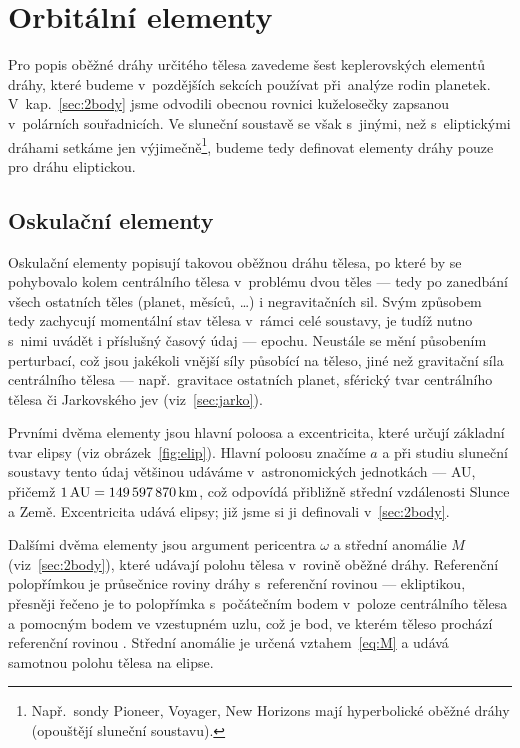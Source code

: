 \documentclass[A4paper, 12pt, oneside]{book}
\begin{document}
\pagebreak
\section{Orbitální elementy} \label{sec:orbelem}
Pro popis oběžné dráhy určitého tělesa zavedeme šest keplerovských elementů dráhy, které budeme v~pozdějších sekcích používat při~analýze rodin planetek. V~kap.~\ref{sec:2body} jsme odvodili obecnou rovnici kuželosečky zapsanou v~polárních souřadnicích. Ve sluneční soustavě se však s~jinými, než s~eliptickými dráhami setkáme jen výjimečně\footnote{Např.\ sondy Pioneer, Voyager, New Horizons mají hyperbolické oběžné dráhy (opouštějí sluneční soustavu).}, budeme tedy definovat elementy dráhy pouze pro dráhu eliptickou.
\subsection{Oskulační elementy}
Oskulační elementy popisují takovou oběžnou dráhu tělesa, po které by se pohybovalo kolem centrálního tělesa v~problému dvou těles --- tedy po zanedbání všech ostatních těles (planet, měsíců, \ldots) i negravitačních sil. Svým způsobem tedy zachycují momentální stav tělesa v~rámci celé soustavy, je tudíž nutno s~nimi uvádět i příslušný časový údaj --- epochu. Neustále se mění působením perturbací, což jsou jakékoli vnější síly působící na těleso, jiné než gravitační síla centrálního tělesa --- např.\ gravitace ostatních planet, sférický tvar centrálního tělesa či Jarkovského jev (viz~\ref{sec:jarko}).

Prvními dvěma elementy jsou hlavní poloosa a excentricita, které určují základní tvar elipsy (viz obrázek~\ref{fig:elip}). Hlavní poloosu značíme $a$ a při studiu sluneční soustavy tento údaj většinou udáváme v~astronomických jednotkách --- AU, přičemž $1\, {\rm AU} = 149\,597\,870\,{\rm km}$, což odpovídá přibližně střední vzdálenosti Slunce a Země. Excentricita udává  elipsy; již jsme si ji definovali v~\ref{sec:2body}.

Dalšími dvěma elementy jsou argument pericentra $\omega$ a střední anomálie $M$ (viz~\ref{sec:2body}), které udávají polohu tělesa v~rovině oběžné dráhy. Referenční polopřímkou je průsečnice roviny dráhy s~referenční rovinou --- ekliptikou, přesněji řečeno je to polopřímka s~počátečním bodem v~poloze centrálního tělesa a pomocným bodem ve vzestupném uzlu, což je bod, ve kterém těleso prochází referenční rovinou . Střední anomálie je určená vztahem~\eqref{eq:M} a udává samotnou polohu tělesa na elipse.
\end{document}

